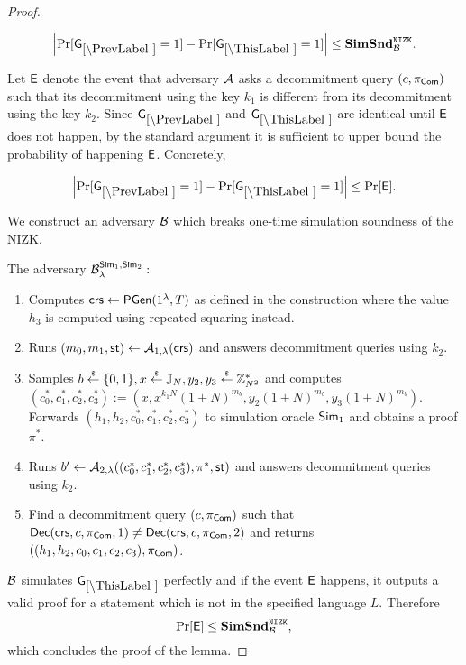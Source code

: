 \begin{proof}
\begin{lemma}
\[
\left|\Pr[\games_\prevgame = 1] - \Pr[\games_\thisgame = 1]\right| \leq \simsnd^\nizk_\advB. 
\]
\end{lemma}

Let $\mathsf{E}$ denote the event that adversary $\mathcal{A}$ asks a decommitment query $(c, \pi_{\mathsf{Com}})$ such that its decommitment using the key $k_1$ is different from its decommitment using the key $k_2$. Since $\games_\prevgame$ and $\games_\thisgame$ are identical until $\mathsf{E}$ does not happen, by the standard argument it is sufficient to upper bound the probability of happening $\mathsf{E}$. Concretely,  

\[
\left|\Pr[\games_\prevgame = 1] - \Pr[\games_\thisgame = 1]\right| \leq \Pr[\event]. 
\]

We construct an adversary $\mathcal{B}$ which breaks one-time simulation soundness of the NIZK. 

The adversary $\mathcal{B}_{\lambda}^{\mathsf{Sim}_1, \mathsf{Sim}_2}:$
\vspace{-2mm}
\begin{enumerate}
\item Computes $\mathsf{crs} \leftarrow \mathsf{PGen}(1{^{\lambda}}, T)$ as defined in the construction where the value $h_3$ is computed using repeated squaring instead.
\item Runs $(m_0, m_1, \mathsf{st}) \leftarrow \mathcal{A}_{1, \lambda}(\mathsf{crs})$ and answers decommitment queries using $k_2$.
\item Samples $b \stackrel{{\scriptscriptstyle\$}}{\leftarrow} \{0,1\}, x \stackrel{{\scriptscriptstyle\$}}{\leftarrow} \mathbb{J}_N, y_2, y_3 \stackrel{{\scriptscriptstyle\$}}{\leftarrow} \mathbb{Z}_{N^2}^*$ and computes $(c_0^*, c_1^*, c_2^*, c_3^*):=(x, x^{k_1 N} (1+N)^{m_b}, y_2 (1+N)^{m_b}, y_3 (1+N)^{m_b})$. Forwards $(h_1, h_2, c_0^*, c_1^*, c_2^*, c_3^*)$ to simulation oracle $\mathsf{Sim}_1$ and obtains a proof $\pi^*$.
\item Runs $b' \leftarrow \mathcal{A}_{2, \lambda}((c_0^*, c_1^*, c_2^*, c_3^*), \pi^*, \mathsf{st})$ and answers decommitment queries using $k_2$.
\item Find a decommitment query $(c, \pi_{\mathsf{Com}})$ such that $\mathsf{Dec}(\mathsf{crs}, c, \pi_{\mathsf{Com}}, 1) \neq \allowbreak \mathsf{Dec}(\mathsf{crs},c, \pi_{\mathsf{Com}}, 2)$ and returns $((h_1, h_2, c_0, c_1, c_2, c_3), \pi_{\mathsf{Com}})$.
\end{enumerate}

$\mathcal{B}$ simulates $\games_\thisgame$ perfectly and if the event $\mathsf{E}$ happens, it outputs a valid proof for a statement which is not in the specified language $L$. Therefore
\[\Pr[\mathsf{E}] \leq \mathbf{SimSnd}^{\mathtt{NIZK}}_{\mathcal{B}},\]
which concludes the proof of the lemma.  


\end{proof}
